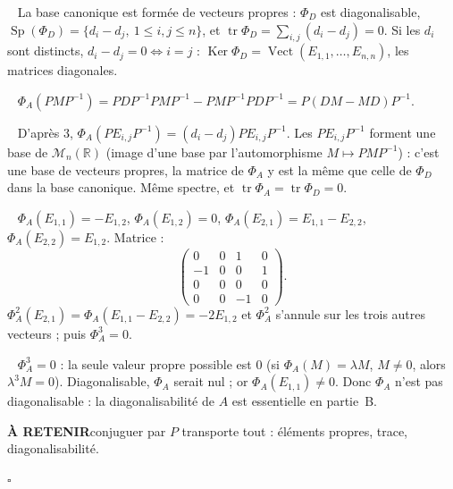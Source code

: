 \documentclass[a4paper,11pt]{article}
\numberwithin{equation}{section}
\numberwithin{figure}{section}
\numberwithin{table}{section}
\theoremstyle{enonce}
\theoremstyle{exemple}
\theoremstyle{remarque}
\newcommand{\R}{\mathbb{R}}
\newcommand{\Mn}[1]{\mathcal{M}_{n}(#1)}
\newcommand{\vect}{\operatorname{Vect}}
\newcommand{\retenir}[1]{\begin{retenirbox}{\sffamily\bfseries\footnotesize\color{Ocre}À RETENIR}\quad #1\end{retenirbox}}
\newcommand{\q}[1]{\par\smallskip\noindent{\sffamily\bfseries\color{Bleu}#1}\ }
\providecommand{\Ker}{\operatorname{Ker}}\renewcommand{\Im}{\operatorname{Im}}\providecommand{\tr}{\operatorname{tr}}\providecommand{\Sp}{\operatorname{Sp}}
\begin{document}
\q{2.} La base canonique est formée de vecteurs propres : $\Phi_D$ est diagonalisable, $\Sp(\Phi_D)=\{d_i-d_j,\ 1\leq i,j\leq n\}$, et
$\tr\Phi_D=\sum_{i,j}(d_i-d_j)=0$. Si les $d_i$ sont distincts, $d_i-d_j=0\iff i=j$ : $\Ker\Phi_D=\vect(E_{1,1},\dots,E_{n,n})$, les matrices
diagonales.

\q{3.} $\Phi_A(PMP^{-1})=PDP^{-1}PMP^{-1}-PMP^{-1}PDP^{-1}=P(DM-MD)P^{-1}$.

\q{4.} D'après 3, $\Phi_A(PE_{i,j}P^{-1})=(d_i-d_j)PE_{i,j}P^{-1}$. Les $PE_{i,j}P^{-1}$ forment une base de $\Mn{\R}$ (image d'une base par
l'automorphisme $M\mapsto PMP^{-1}$) : c'est une base de vecteurs propres, la matrice de $\Phi_A$ y est la même que celle de $\Phi_D$
dans la base canonique. Même spectre, et $\tr\Phi_A=\tr\Phi_D=0$.

\q{5.} $\Phi_A(E_{1,1})=-E_{1,2}$, $\Phi_A(E_{1,2})=0$, $\Phi_A(E_{2,1})=E_{1,1}-E_{2,2}$, $\Phi_A(E_{2,2})=E_{1,2}$. Matrice :
\[\begin{pmatrix}0&0&1&0\\-1&0&0&1\\0&0&0&0\\0&0&-1&0\end{pmatrix}.\]
$\Phi_A^2(E_{2,1})=\Phi_A(E_{1,1}-E_{2,2})=-2E_{1,2}$ et $\Phi_A^2$ s'annule sur les trois autres vecteurs ; puis $\Phi_A^3=0$.

\q{6.} $\Phi_A^3=0$ : la seule valeur propre possible est $0$ (si $\Phi_A(M)=\lambda M$, $M\neq0$, alors $\lambda^3M=0$). Diagonalisable,
$\Phi_A$ serait nul ; or $\Phi_A(E_{1,1})\neq0$. Donc $\Phi_A$ n'est pas diagonalisable : la diagonalisabilité de $A$ est essentielle en partie~B.
\retenir{conjuguer par $P$ transporte tout : éléments propres, trace, diagonalisabilité.}
\par\hfill\textcolor{BleuClair}{$\square$}\par
\end{document}
